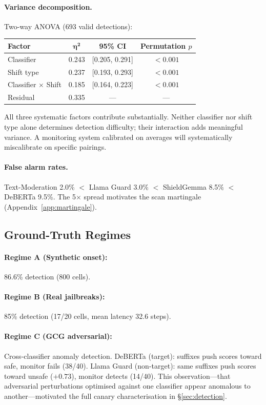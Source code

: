 \documentclass{article}
\begin{document}
\paragraph{Variance decomposition.} Two-way ANOVA (693 valid detections):

\begin{table}[h]
\centering
\small
\begin{tabular}{lccc}
\toprule
\textbf{Factor} & $\boldsymbol{\eta^2}$ & \textbf{95\% CI} & \textbf{Permutation $p$} \\
\midrule
Classifier & 0.243 & [0.205, 0.291] & $< 0.001$ \\
Shift type & 0.237 & [0.193, 0.293] & $< 0.001$ \\
Classifier $\times$ Shift & 0.185 & [0.164, 0.223] & $< 0.001$ \\
Residual & 0.335 & --- & --- \\
\bottomrule
\end{tabular}
\end{table}

All three systematic factors contribute substantially. Neither classifier nor shift type alone determines detection difficulty; their interaction adds meaningful variance. A monitoring system calibrated on averages will systematically miscalibrate on specific pairings.

\paragraph{False alarm rates.} Text-Moderation 2.0\% $<$ Llama Guard 3.0\% $<$ ShieldGemma 8.5\% $<$ DeBERTa 9.5\%. The 5$\times$ spread motivates the scan martingale (Appendix~\ref{app:martingale}).

\subsection{Ground-Truth Regimes}

\paragraph{Regime A (Synthetic onset):} 86.6\% detection (800 cells).

\paragraph{Regime B (Real jailbreaks):} 85\% detection (17/20 cells, mean latency 32.6 steps).

\paragraph{Regime C (GCG adversarial):} Cross-classifier anomaly detection. DeBERTa (target): suffixes push scores toward safe, monitor fails (38/40). Llama Guard (non-target): same suffixes push scores toward unsafe ($+0.73$), monitor detects (14/40). This observation---that adversarial perturbations optimised against one classifier appear anomalous to another---motivated the full canary characterisation in \S\ref{sec:detection}.
\end{document}
